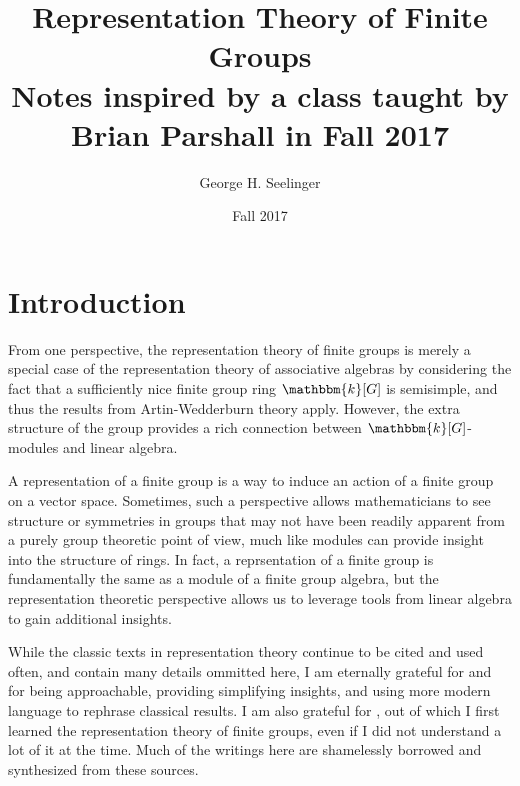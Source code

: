 \documentclass[11pt,leqno,oneside]{amsbook}
\title[Representation Theory of Finite Groups]{Representation Theory
  of Finite Groups \\ Notes
  inspired by a class taught by Brian Parshall in Fall 2017}
\author{George H. Seelinger}
\date{Fall 2017}
\newcommand{\bbk}{\mathbbm{k}}
\numberwithin{thm}{section}
\begin{document}
\maketitle
\section{Introduction}
From one perspective, the representation theory of finite groups is merely a
special case of the representation theory of associative algebras by
considering the fact that a sufficiently nice finite group ring \(\bbk[G]\)
is semisimple, and thus the results from Artin-Wedderburn
theory apply. However, the extra structure of the group provides a
rich connection between \(\bbk[G]\)-modules and linear algebra.

A representation of a finite group is a way to induce an action of a
finite group on a vector space. Sometimes, such a perspective allows
mathematicians to see structure or symmetries in groups that may not
have been readily apparent from a purely group theoretic point of
view, much like modules can provide insight into the structure of
rings. In fact, a reprsentation of a finite group is fundamentally the
same as a module of a finite group algebra, but the representation
theoretic perspective allows us to leverage tools from linear algebra
to gain additional insights.

While the classic texts in representation theory continue to be cited
and used often, and contain many details ommitted here, I am eternally
grateful for \cite{etingof} and \cite{smith} for being approachable,
providing simplifying insights, and using more modern language to
rephrase classical results. I am also grateful for \cite{ct}, out of
which I first learned the representation theory of finite groups, even
if I did not understand a lot of it at the time. Much of the writings
here are shamelessly  borrowed and synthesized from these sources.
\end{document}
